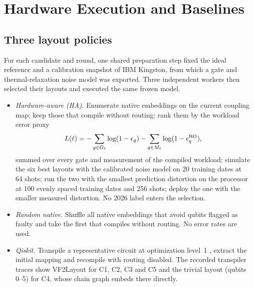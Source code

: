 \documentclass[journal]{IEEEtran}
\begin{document}
\section{Hardware Execution and Baselines}
\subsection{Three layout policies}
For each candidate and round, one shared preparation step fixed the ideal reference and a calibration snapshot of IBM Kingston, from which a gate and thermal-relaxation noise model was exported. Three independent workers then selected their layouts and executed the same frozen model.
\begin{itemize}
\item \emph{Hardware-aware (HA).} Enumerate native embeddings on the current coupling map; keep those that compile without routing; rank them by the workload error proxy
\begin{equation}
L(\ell)=-\sum_{g\in G_\ell}\log(1-\epsilon_g)-\sum_{q\in M_\ell}\log(1-\epsilon^{\rm RO}_q),
\label{eq:proxy}
\end{equation}
summed over every gate and measurement of the compiled workload; simulate the six best layouts with the calibrated noise model on 20 training dates at 64 shots; run the two with the smallest prediction distortion on the processor at 100 evenly spaced training dates and 256 shots; deploy the one with the smaller measured distortion. No 2026 label enters the selection.
\item \emph{Random native.} Shuffle all native embeddings that avoid qubits flagged as faulty and take the first that compiles without routing. No error rates are used.
\item \emph{Qiskit.} Transpile a representative circuit at optimization level~1 \cite{JavadiAbhari2024Qiskit}, extract the initial mapping and recompile with routing disabled. The recorded transpiler traces show VF2Layout for C1, C2, C3 and C5 and the trivial layout (qubits 0--5) for C4, whose chain graph embeds there directly.
\end{itemize}
\end{document}
